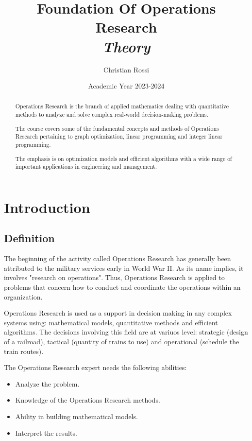 \documentclass[12pt, a4paper]{report}
\title{Foundation Of Operations Research \\ \textit{Theory}}
\author{Christian Rossi}
\date{Academic Year 2023-2024}
\newtheorem[style=M,bodystyle=\normalfont]{theorem}{Theorem}
\newtheorem[style=M,bodystyle=\normalfont]{corollary}{Corollary}
\newtheorem[style=M,bodystyle=\normalfont]{lemma}{Lemma}
\newtheorem[style=M,bodystyle=\normalfont]{definition}{Definition}
\begin{document}
\maketitle

\newpage

\begin{abstract}
    Operations Research is the branch of applied mathematics dealing with quantitative methods to analyze and solve
    complex real-world decision-making problems. 
    
    The course covers some of the fundamental concepts and methods of Operations Research pertaining to graph optimization, 
    linear programming and integer linear programming. 
    
    The emphasis is on optimization models and efficient algorithms with a wide range of important applications in 
    engineering and management.  
\end{abstract}

\newpage

\tableofcontents

\newpage

\chapter{Introduction}
\section{Definition}
The beginning of the activity called Operations Research has generally been attributed to the military services early in 
World War II. As its name implies, it involves "research on operations". Thus, Operations Research is applied to problems that
concern how to conduct and coordinate the operations within an organization. 

Operations Research is used as a support in decision making in any complex systems using: mathematical models, quantitative methods
and efficient algorithms. The decisions involving this field are at variuos level: strategic (design of a railroad),
tactical (quantity of trains to use) and operational (schedule the train routes).

The Operations Research expert needs the following abilities: 
\begin{itemize}
    \item Analyze the problem.
    \item Knowledge of the Operations Research methods.
    \item Ability in building mathematical models. 
    \item Interpret the results.
\end{itemize}
\end{document}
